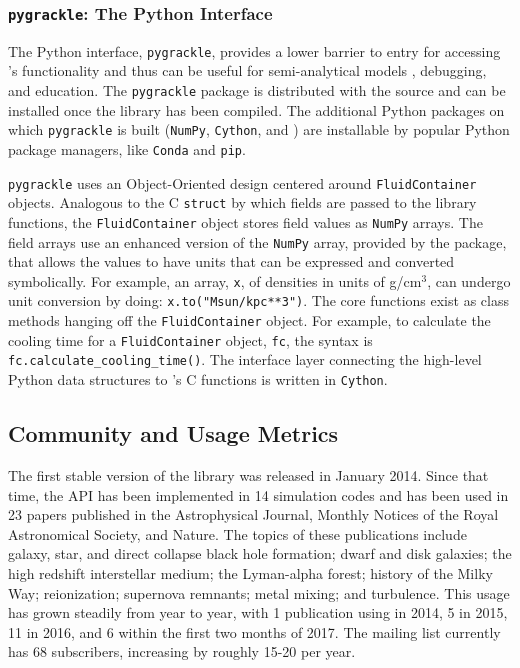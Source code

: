\subsubsection{\texttt{pygrackle}: The Python Interface}

The Python interface, \texttt{pygrackle}, provides a lower barrier to
entry for accessing \grackle{}'s functionality and thus can be
useful for semi-analytical models \citep[e.g.,][]{2016ApJ...820...71C,
2016MNRAS.459.4209A}, debugging, and education.  The
\texttt{pygrackle} package is distributed with the \grackle{} source
and can be installed once the library has been compiled.  The
additional Python packages on which \texttt{pygrackle} is built
(\texttt{NumPy}, \texttt{Cython}, and \yt{}) are
installable by popular Python package managers, like \texttt{Conda}
and \texttt{pip}.

\texttt{pygrackle} uses an Object-Oriented design centered around
\texttt{FluidContainer} objects.  Analogous to the C \texttt{struct}
by which fields are passed to the \grackle{} library functions, the
\texttt{FluidContainer} object stores field values as \texttt{NumPy}
arrays.  The field arrays use an enhanced version of the
\texttt{NumPy} array, provided by the \yt{} package, that allows
the values to have units that can be expressed and converted
symbolically.  For example, an array, \texttt{x}, of densities in units of
g/cm$^{3}$, can undergo unit conversion by doing:
\texttt{x.to("Msun/kpc**3")}.  The core \grackle{} functions exist as
class methods hanging off the \texttt{FluidContainer} object.  For
example, to calculate the cooling time for a \texttt{FluidContainer}
object, \texttt{fc}, the syntax is
\texttt{fc.calculate\_cooling\_time()}.  The interface layer
connecting the high-level Python data structures to \grackle{}'s C
functions is written in \texttt{Cython}.

\subsection{Community and Usage Metrics}

The first stable version of the \grackle{} library was released in
January 2014.  Since that time, the \grackle{} API has been
implemented in 14 simulation codes and has been used in 23 papers
published in the Astrophysical Journal, Monthly Notices of the Royal
Astronomical Society, and Nature.  The topics of these publications
include galaxy, star, and direct collapse black hole formation; dwarf
and disk galaxies; the high redshift interstellar medium; the
Lyman-alpha forest; history of the Milky Way; reionization; supernova
remnants; metal mixing; and turbulence.  This usage has grown steadily
from year to year, with 1 publication using \grackle{} in 2014, 5 in
2015, 11 in 2016, and 6 within the first two months of 2017.  The
\grackle{} mailing list currently has 68 subscribers, increasing by
roughly 15-20 per year.


